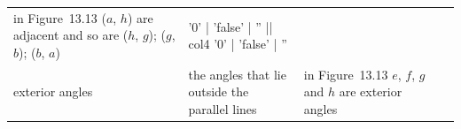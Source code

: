 \begin{table}[H]
\begin{center}
\begin{xtabular*}{\mytablewidth}[t]{|p{3cm}|p{3cm}|p{3cm}|p{20\mystarwidth}|}
        in Figure~13.13 (\begin{math}a\end{math}, \begin{math}h\end{math}) are
adjacent and so are (\begin{math}h\end{math}, \begin{math}g\end{math});
(\begin{math}g\end{math}, \begin{math}b\end{math}); (\begin{math}b\end{math},
\begin{math}a\end{math}) &
    
    
'0' | 'false' | '' || col4 '0' | 'false' | ''
     \tabularnewline{}
    
    
        exterior angles &
    
    
        the angles that lie outside the parallel lines &
    
    
        in Figure~13.13 \begin{math}e\end{math}, \begin{math}f\end{math},
\begin{math}g\end{math} and \begin{math}h\end{math} are exterior angles &
    

\end{xtabular*}
\end{center}
\end{table}

